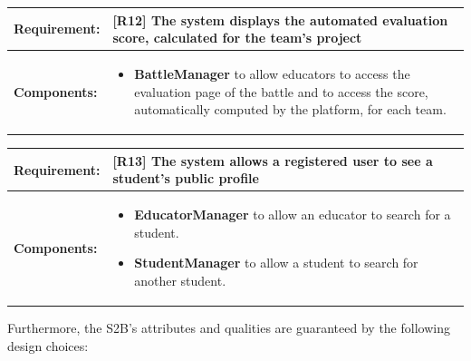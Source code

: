 \documentclass[12pt,oneside,a4paper]{article}
\begin{document}
\begin{table}[htbp]
\begin{tabular}{|l|p{12cm}|}
    \hline
    \textbf{Requirement:} & [R12] The system displays the automated evaluation score, calculated for the team’s project\\
    \hline
    \textbf{Components:} & \begin{itemize}
        \item \textbf{BattleManager} to allow educators to access the evaluation page of the battle and to access the score, automatically computed by the platform, for each team.
    \end{itemize}\\
    \hline
\end{tabular}
\end{table}

\begin{table}[htbp]
\begin{tabular}{|l|p{12cm}|}
    \hline
    \textbf{Requirement:} & [R13] The system allows a registered user to see a student’s public profile\\
    \hline
    \textbf{Components:} & \begin{itemize}
        \item \textbf{EducatorManager} to allow an educator to search for a student.
        \item \textbf{StudentManager} to allow a student to search for another student.
    \end{itemize}\\
    \hline
\end{tabular}
\end{table}

\clearpage

\begin{flushleft}
Furthermore, the S2B's attributes and qualities are guaranteed by the following design choices:
\end{flushleft}
\end{document}
